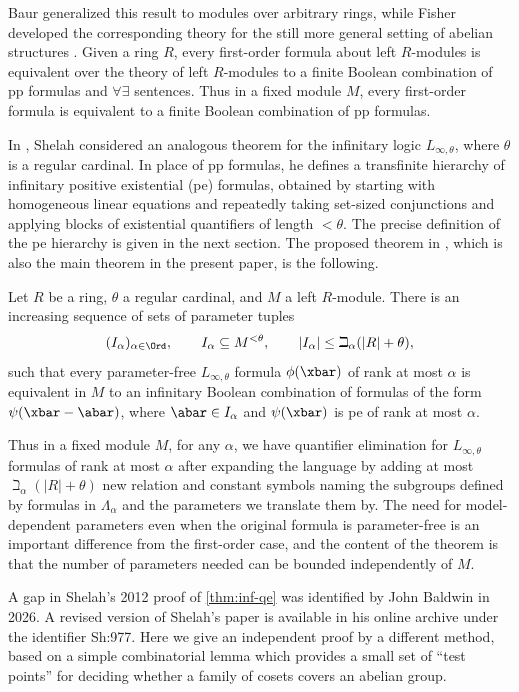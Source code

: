 \documentclass[11pt]{article}
\begin{document}
Baur generalized this result to modules over arbitrary rings, while Fisher developed the corresponding theory for the still more general setting of abelian structures \cite{Baur1976,Fisher1977}. Given a ring $R$, every first-order formula about left $R$-modules is equivalent over the theory of left $R$-modules to a finite Boolean combination of pp formulas and $\forall \exists$ sentences. Thus in a fixed module $M$, every first-order formula is equivalent to a finite Boolean combination of pp formulas.

In \cite{Shelah2012}, Shelah considered an analogous theorem for the infinitary logic $L_{\infty,\theta}$, where $\theta$ is a regular cardinal. In place of pp formulas, he defines a transfinite hierarchy of infinitary positive existential (pe) formulas, obtained by starting with homogeneous linear equations and repeatedly taking set-sized conjunctions and applying blocks of existential quantifiers of length $< \theta$. The precise definition of the pe hierarchy is given in the next section. The proposed theorem in \cite{Shelah2012}, which is also the main theorem in the present paper, is the following. 

\begin{theorem}
\label{thm:inf-qe}
    Let $R$ be a ring, $\theta$ a regular cardinal, and $M$ a left $R$-module. 
    There is an increasing sequence of sets of parameter tuples
    \[
    (I_\alpha)_{\alpha \in \Ord}, \qquad I_\alpha \subseteq M^{<\theta}, \qquad |I_\alpha| \leq \beth_\alpha(|R| + \theta),
    \]
   such that every parameter-free $L_{\infty,\theta}$ formula $\phi(\xbar)$ of rank at most $\alpha$  is equivalent in $M$ to an infinitary Boolean combination of formulas of the form $\psi(\xbar - \abar)$, where $\abar \in I_\alpha$ and $\psi(\xbar)$ is pe of rank at most $\alpha$. 
\end{theorem}

Thus in a fixed module $M$, for any $\alpha$, we have quantifier elimination for $L_{\infty,\theta}$ formulas of rank at most $\alpha$ after expanding the language by adding at most $\beth_\alpha(|R| + \theta)$ new relation and constant symbols naming the subgroups defined by formulas in $\Lambda_\alpha$ and the parameters we translate them by. The need for model-dependent parameters even when the original formula is parameter-free is an important difference from the first-order case, and the content of the theorem is that the number of parameters needed can be bounded independently of $M$.

A gap in Shelah's 2012 proof of \cref{thm:inf-qe} was identified by John Baldwin in 2026. A revised version of Shelah’s paper is available in his online archive under the identifier Sh:977. Here we give an independent proof by a different method, based on a simple combinatorial lemma which provides a small set of ``test points'' for deciding whether a family of cosets covers an abelian group.
\end{document}
